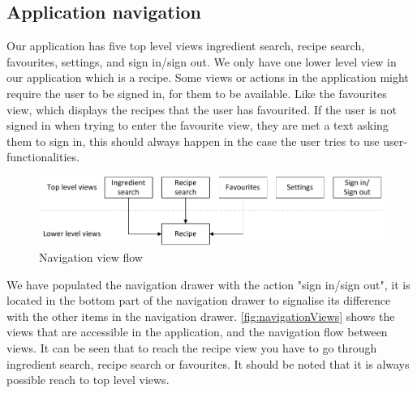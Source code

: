 \subsection{Application navigation}
Our application has five top level views ingredient search, recipe search, favourites, settings, and sign in/sign out. 
We only have one lower level view in our application which is a recipe. 
Some views or actions in the application might require the user to be signed in, for them to be available. 
Like the favourites view, which displays the recipes that the user has favourited. 
If the user is not signed in when trying to enter the favourite view, they are met a text asking them to sign in, this should always happen in the case the user tries to use user-functionalities. 
\begin{figure}[H]
\centering
\includegraphics[width=1.0\linewidth]{img/navigation.pdf}
\caption{Navigation view flow}
\label{fig:navigationViews}
\end{figure}
We have populated the navigation drawer with the action "sign in/sign out", it is located in the bottom part of the navigation drawer to signalise its difference with the other items in the navigation drawer. \autoref{fig:navigationViews} shows the views that are accessible in the application, and the navigation flow between views. It can be seen that to reach the recipe view you have to go through ingredient search, recipe search or favourites. It should be noted that it is always possible reach to top level views.